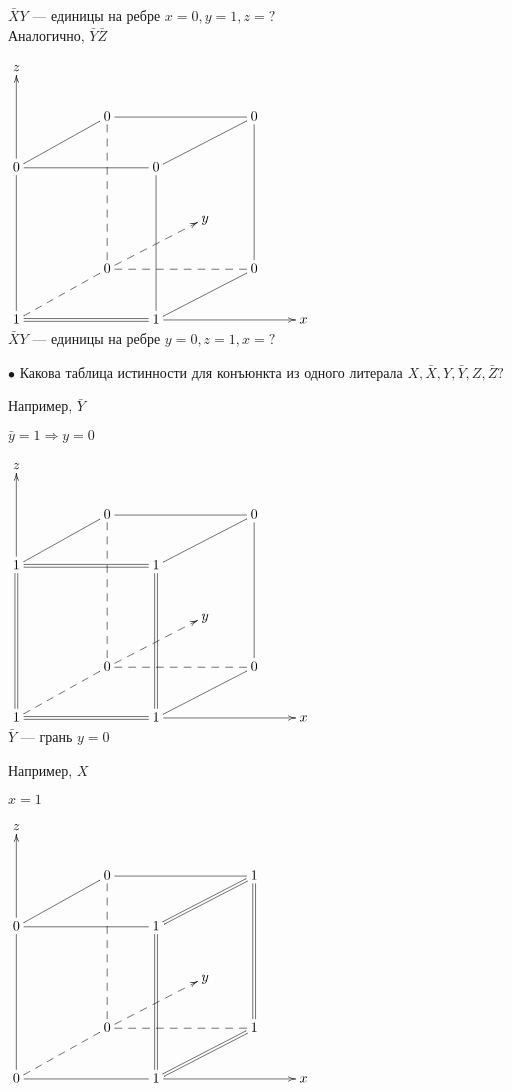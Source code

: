 \documentclass[a4paper, 12pt] {article}
\begin{document}
$ \bar X Y $ --- единицы на ребре $ x = 0, y = 1, z = ? $\\

Аналогично, $ \bar Y \bar Z $

$ 
\begin{matrix}
	\xymatrix{
		z &   &  &   & & &\\
		&   & 0 \ar@{-}[lld] \ar@{--}[ddd] &   & & 0 \ar@{-}[lld] \ar@{-}[lll]&\\
		0 \ar@{->}[uu] \ar@{-}[rrr] &   &  & 0  & & &\\
		&   &  &   & y & &\\
		&   & 0 \ar@{--}[lld] \ar@{-->}[rru] \ar@{--}[rrr] &   & & 0 \ar@{-}[uuu]  &\\
		1  \ar@{-}[uuu] \ar@{=}[rrr] & & & 1 \ar@{->}[rrr] \ar@{-}[uuu] \ar@{-}[rru] & & & x \\
	}
\end{matrix}
$\\

$ \bar X Y $ --- единицы на ребре $ y = 0, z = 1, x = ? $

\newpage

$ \bullet $ Какова таблица истинности для конъюнкта из одного литерала $ X, \bar X, Y, \bar Y, Z, \bar Z? $

Например, $ \bar Y $

$ \bar y = 1 \Rightarrow y = 0 $

$ 
\begin{matrix}
	\xymatrix{
		z &   &  &   & & &\\
		&   & 0 \ar@{-}[lld] \ar@{--}[ddd] &   & & 0 \ar@{-}[lld] \ar@{-}[lll]&\\
		1 \ar@{->}[uu] \ar@{=}[rrr] &   &  & 1  & & &\\
		&   &  &   & y & &\\
		&   & 0 \ar@{--}[lld] \ar@{-->}[rru] \ar@{--}[rrr] &   & & 0 \ar@{-}[uuu]  &\\
		1  \ar@{=}[uuu] \ar@{=}[rrr] & & & 1 \ar@{->}[rrr] \ar@{=}[uuu] \ar@{-}[rru] & & & x \\
	}
\end{matrix}
$\\

$ \bar Y $ --- грань $ y =0 $

Например, $ X $

$ x = 1 $

$ 
\begin{matrix}
	\xymatrix{
		z &   &  &   & & &\\
		&   & 0 \ar@{-}[lld] \ar@{--}[ddd] &   & & 1 \ar@{=}[lld] \ar@{-}[lll]&\\
		0 \ar@{->}[uu] \ar@{-}[rrr] &   &  & 1  & & &\\
		&   &  &   & y & &\\
		&   & 0 \ar@{--}[lld] \ar@{-->}[rru] \ar@{--}[rrr] &   & & 1 \ar@{=}[uuu]  &\\
		0  \ar@{-}[uuu] \ar@{-}[rrr] & & & 1 \ar@{->}[rrr] \ar@{=}[uuu] \ar@{=}[rru] & & & x \\
	}
\end{matrix}
$\\
\end{document}
